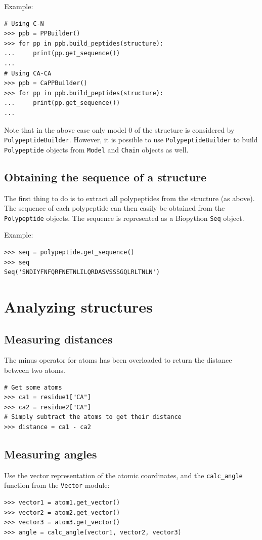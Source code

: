 Example:

\begin{verbatim}
# Using C-N
>>> ppb = PPBuilder()
>>> for pp in ppb.build_peptides(structure):
...     print(pp.get_sequence())
...
# Using CA-CA
>>> ppb = CaPPBuilder()
>>> for pp in ppb.build_peptides(structure):
...     print(pp.get_sequence())
...
\end{verbatim}
Note that in the above case only model 0 of the structure is considered
by \texttt{PolypeptideBuilder}. However, it is possible to use \texttt{PolypeptideBuilder}
to build \texttt{Polypeptide} objects from \texttt{Model} and \texttt{Chain}
objects as well.

\subsection*{Obtaining the sequence of a structure}

The first thing to do is to extract all polypeptides from the structure
(as above). The sequence of each polypeptide can then easily
be obtained from the \texttt{Polypeptide} objects. The sequence is
represented as a Biopython \texttt{Seq} object.

Example:

\begin{verbatim}
>>> seq = polypeptide.get_sequence()
>>> seq
Seq('SNDIYFNFQRFNETNLILQRDASVSSSGQLRLTNLN')
\end{verbatim}

\section{Analyzing structures}

\subsection{Measuring distances}
The minus operator for atoms has been overloaded to return the distance between two atoms.
\begin{verbatim}
# Get some atoms
>>> ca1 = residue1["CA"]
>>> ca2 = residue2["CA"]
# Simply subtract the atoms to get their distance
>>> distance = ca1 - ca2
\end{verbatim}

\subsection{Measuring angles}
Use the vector representation of the atomic coordinates, and
the \texttt{calc\_angle} function from the \texttt{Vector} module:
\begin{verbatim}
>>> vector1 = atom1.get_vector()
>>> vector2 = atom2.get_vector()
>>> vector3 = atom3.get_vector()
>>> angle = calc_angle(vector1, vector2, vector3)
\end{verbatim}

